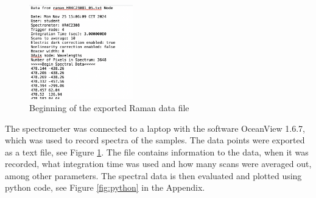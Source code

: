 \begin{figure}
    \vspace{-20pt}
    \centering
    \includegraphics[width=0.4\textwidth]{images/data_raman.png}
    \vspace{-30pt}
    \caption{Beginning of the exported Raman data file}
    \label{fig:raman_txt}
    \vspace{-10pt}
\end{figure}
The spectrometer was connected to a laptop with the software OceanView 1.6.7, which was used to record spectra of the samples. The data points were exported as a text file, see Figure \ref{fig:raman_txt}. The file contains information to the data, when it was recorded, what integration time was used and how many scans were averaged out, among other parameters. The spectral data is then evaluated and plotted using python code, see Figure \ref{fig:python} in the Appendix.

\bigskip

